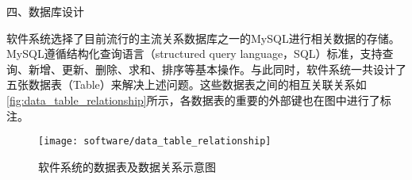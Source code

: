 四、数据库设计



软件系统选择了目前流行的主流关系数据库之一的MySQL进行相关数据的存储\cite{mysql}。MySQL遵循结构化查询语言（structured query language，SQL）标准，支持查询、新增、更新、删除、求和、排序等基本操作。与此同时，软件系统一共设计了五张数据表（Table）来解决上述问题。这些数据表之间的相互关联关系如\autoref{fig:data_table_relationship}所示，各数据表的重要的外部键也在图中进行了标注。
\begin{figure}[htbp]
    \centering
    \texttt{[image: software/data\_table\_relationship]}
    \caption{\label{fig:data_table_relationship}软件系统的数据表及数据关系示意图}
\end{figure}

